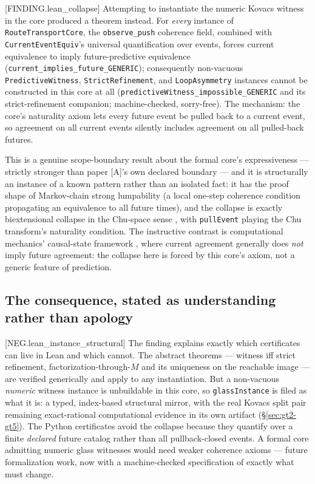 \documentclass[11pt]{article}
\newcommand{\claimref}[2]{[#1]}
\theoremstyle{definition}
\begin{document}
\claimref{FINDING.lean\_collapse}{c70185334829fe8ad9f879a2288e90efe3d24700b8eeb5593f2de05341b62a51}
Attempting to instantiate the numeric Kovacs witness in the core produced a theorem instead. For
\emph{every} instance of \texttt{RouteTransportCore}, the \texttt{observe\_push} coherence field,
combined with \texttt{CurrentEventEquiv}'s universal quantification over events, forces current
equivalence to imply future-predictive equivalence
(\texttt{current\_implies\_future\_GENERIC}); consequently non-vacuous \texttt{PredictiveWitness},
\texttt{StrictRefinement}, and \texttt{LoopAsymmetry} instances cannot be constructed in this core
at all (\texttt{predictiveWitness\_impossible\_GENERIC} and its strict-refinement companion;
machine-checked, sorry-free). The mechanism:
the core's naturality axiom lets every future event be pulled back to a current event, so
agreement on all current events silently includes agreement on all pulled-back futures.

This is a genuine scope-boundary result about the formal core's expressiveness --- strictly
stronger than paper [A]'s own declared boundary --- and it is structurally an instance of a known
pattern rather than an isolated fact: it has the proof shape of Markov-chain strong lumpability
\cite{kemeny-snell-1960,buchholz-1994} (a local one-step coherence condition propagating an
equivalence to all future times), and the collapse is exactly biextensional collapse in the
Chu-space sense \cite{barr-1979,pratt-1999,parente-2024}, with \texttt{pullEvent} playing the Chu
transform's naturality condition. The instructive contrast is computational mechanics'
causal-state framework \cite{shalizi-crutchfield-2001}, where current agreement generally does
\emph{not} imply future agreement: the collapse here is forced by this core's axiom, not a
generic feature of prediction.

\subsection{The consequence, stated as understanding rather than apology}

\claimref{NEG.lean\_instance\_structural}{014c387c154a27d21d86e0454c25fea4ddc7ac8ecd3e7d3ea116d6f068a296c1}
The finding explains exactly which certificates can live in Lean and which cannot. The abstract
theorems --- witness iff strict refinement, factorization-through-$M$ and its uniqueness on the
reachable image --- are verified generically and apply to any instantiation. But a non-vacuous
\emph{numeric} witness instance is unbuildable in this core, so \texttt{glassInstance} is filed as
what it is: a typed, index-based structural mirror, with the real Kovacs split pair remaining
exact-rational computational evidence in its own artifact (\S\ref{sec:gt2-gt5}). The Python
certificates avoid the collapse because they quantify over a finite \emph{declared} future
catalog rather than all pullback-closed events. A formal core admitting numeric glass witnesses
would need weaker coherence axioms --- future formalization work, now with a machine-checked
specification of exactly what must change.
\end{document}
